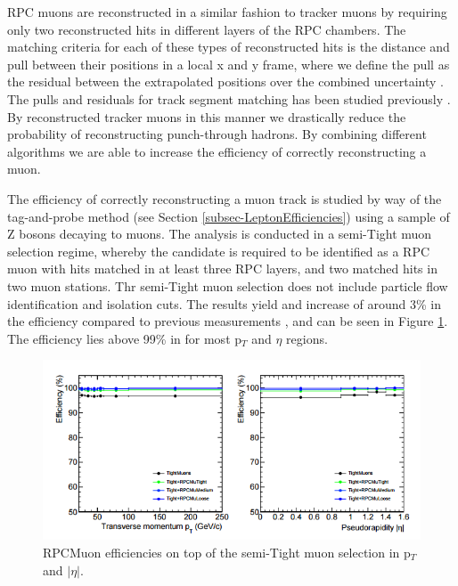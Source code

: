 RPC muons are reconstructed in a similar fashion to tracker muons by requiring only two reconstructed hits in different layers of the RPC chambers. The matching criteria for each of these types of reconstructed hits is the distance and pull between their positions in a local x and y frame, where we define the pull as the residual between the extrapolated positions over the combined uncertainty \cite{MUO-12-482}. The pulls and residuals for track segment matching has been studied previously \cite{Chatrchyan:2013sba}. By reconstructed tracker muons in this manner we drastically reduce the probability of reconstructing punch-through hadrons. By combining different algorithms we are able to increase the efficiency of correctly reconstructing a muon.

The efficiency of correctly reconstructing a muon track is studied by way of the tag-and-probe method (see Section \ref{subsec-LeptonEfficiencies}) using a sample of Z bosons decaying to muons. The analysis is conducted in a semi-Tight muon selection regime, whereby the candidate is required to be identified as a RPC muon with hits matched in at least three RPC layers, and two matched hits in two muon stations. Thr semi-Tight muon selection does not include particle flow identification and isolation cuts. The results yield and increase of around 3\% in the efficiency compared to previous measurements \cite{MUO-12-482}, and can be seen in Figure \ref{fig-MuonEfficiencies}. The efficiency lies above 99\% in for most p$_T$ and $\eta$ regions. 

\begin{figure} \label{fig-MuonEfficiencies}
\begin{center}
\includegraphics[width=\textwidth]{Figures/MuonEfficiencies.png}
\caption{RPCMuon efficiencies on top of the semi-Tight muon selection in p$_T$ and $|\eta|$. \cite{MUO-12-482}}
\end{center}
\end{figure}


